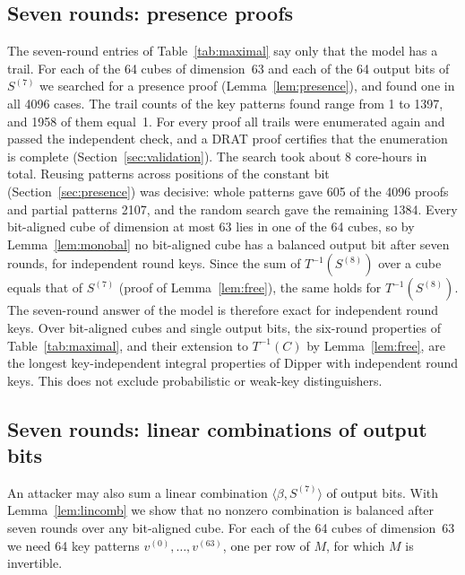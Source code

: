 \documentclass[pdflatex,sn-mathphys-num]{sn-jnl}
\theoremstyle{thmstyleone}
\theoremstyle{thmstylethree}
\theoremstyle{thmstyletwo}
\begin{document}
\subsection{Seven rounds: presence proofs}\label{sec:r7presence}
The seven-round entries of Table~\ref{tab:maximal} say only that the model has a trail. For each of the 64 cubes of dimension~63 and each of the 64 output bits of $S^{(7)}$ we searched for a presence proof (Lemma~\ref{lem:presence}), and found one in all 4096 cases. The trail counts of the key patterns found range from 1 to 1397, and 1958 of them equal~1. For every proof all trails were enumerated again and passed the independent check, and a DRAT proof certifies that the enumeration is complete (Section~\ref{sec:validation}). The search took about 8 core-hours in total. Reusing patterns across positions of the constant bit (Section~\ref{sec:presence}) was decisive: whole patterns gave 605 of the 4096 proofs and partial patterns 2107, and the random search gave the remaining 1384. Every bit-aligned cube of dimension at most 63 lies in one of the 64 cubes, so by Lemma~\ref{lem:monobal} no bit-aligned cube has a balanced output bit after seven rounds, for independent round keys. Since the sum of $T^{-1}(S^{(8)})$ over a cube equals that of $S^{(7)}$ (proof of Lemma~\ref{lem:free}), the same holds for $T^{-1}(S^{(8)})$. The seven-round answer of the model is therefore exact for independent round keys. Over bit-aligned cubes and single output bits, the six-round properties of Table~\ref{tab:maximal}, and their extension to $T^{-1}(C)$ by Lemma~\ref{lem:free}, are the longest key-independent integral properties of Dipper with independent round keys. This does not exclude probabilistic or weak-key distinguishers.

\subsection{Seven rounds: linear combinations of output bits}\label{sec:r7lin}
An attacker may also sum a linear combination $\langle\beta,S^{(7)}\rangle$ of output bits. With Lemma~\ref{lem:lincomb} we show that no nonzero combination is balanced after seven rounds over any bit-aligned cube. For each of the 64 cubes of dimension~63 we need 64 key patterns $v^{(0)},\dots,v^{(63)}$, one per row of $M$, for which $M$ is invertible.
\end{document}
